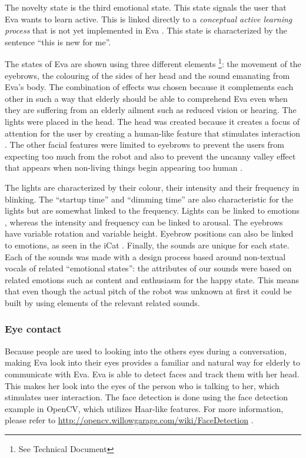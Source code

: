 \documentclass[project_eva.tex]{subfiles}
\begin{document}
The novelty state is the third emotional state. This state signals the user that Eva wants to learn active. This is linked 
directly to a \textit{conceptual active learning process} that is not yet implemented in Eva \pageref{sec:Concept}. This state is characterized by the sentence ``this is new for me''.

The states of Eva are shown using three different elements \footnote{See Technical Document}: the movement of the eyebrows, the colouring of the sides of her head  and the sound emanating from Eva’s body. The combination of effects was chosen because it complements each other in such a way that elderly should be able to comprehend Eva even when they are suffering from an elderly ailment such as reduced vision or hearing. The lights were placed in the head. The head was created because it creates a focus of attention for the user by creating a human-like feature that stimulates interaction \cite{elderly}. The other facial features were limited to eyebrows to prevent the users from expecting too much from the robot and also to prevent the uncanny valley effect that appears when non-living things begin appearing too human \cite{uncanny}. 

The lights are characterized by their colour, their intensity and their frequency in blinking. The ``startup time'' and 
``dimming time'' are also characteristic for the lights but are somewhat linked to the frequency. Lights can be linked to 
emotions \cite{colour-emotion} , whereas the intensity and frequency can be linked to arousal. The eyebrows have variable rotation and variable height. Eyebrow positions can also be linked to emotions, as seen in the iCat \cite{iCat}. Finally, the sounds are unique for each state. Each of the sounds was made with a design process based around non-textual vocals of related ``emotional states'': the attributes of our sounds were based on related emotions  such as content and enthusiasm for the happy state. This means that even though the actual pitch of the robot was unknown at first it could be built by using elements \cite{sounds} of the relevant related sounds.

\subsubsection*{Eye contact}
Because people are used to looking into the other\textquotesingle s eyes during a conversation, making Eva look into their eyes provides a familiar and natural way for elderly to communicate with Eva. Eva is able to detect faces and track them with her head. This makes her look into the eyes of the person who is talking to her, which stimulates user interaction. The face detection is done using the face detection example in OpenCV, which utilizes Haar-like features. For more information, please refer to \url{http://opencv.willowgarage.com/wiki/FaceDetection} \cite{FaceDetection} .
\end{document}
